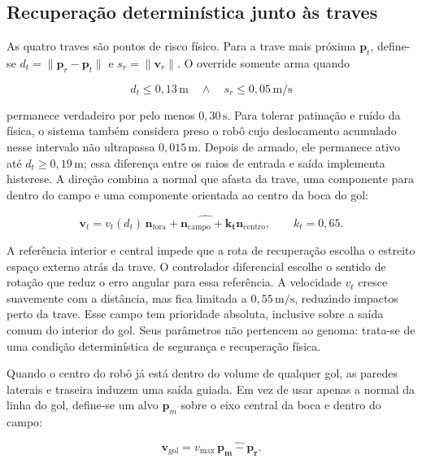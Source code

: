 \documentclass[12pt,a4paper]{article}
\newcommand{\vect}[1]{\boldsymbol{#1}}
\newcommand{\unit}[1]{\widehat{\vect{#1}}}
\begin{document}
\subsection{Recupera\c{c}\~ao determin\'istica junto \`as traves}

As quatro traves s\~ao pontos de risco f\'isico. Para a trave mais pr\'oxima
$\vect{p}_t$, define-se $d_t=\|\vect{p}_r-\vect{p}_t\|$ e
$s_r=\|\vect{v}_r\|$. O override somente arma quando

\begin{equation}
 d_t\leq 0{,}13\,\mathrm{m}\quad\land\quad
 s_r\leq 0{,}05\,\mathrm{m/s}
\end{equation}

permanece verdadeiro por pelo menos $0{,}30\,\mathrm{s}$. Para tolerar
patina\c{c}\~ao e ru\'ido da f\'isica, o sistema tamb\'em considera preso o rob\^o
cujo deslocamento acumulado nesse intervalo n\~ao ultrapassa $0{,}015\,\mathrm{m}$.
Depois de armado,
ele permanece ativo at\'e $d_t\geq0{,}19\,\mathrm{m}$; essa diferen\c{c}a entre
os raios de entrada e sa\'ida implementa histerese. A dire\c{c}\~ao combina a
normal que afasta da trave, uma componente para dentro do campo e uma componente
orientada ao centro da boca do gol:

\begin{equation}
 \vect{v}_{t}=v_t(d_t)\,\unit{\vect{n}_{\mathrm{fora}}+
 \vect{n}_{\mathrm{campo}}+k_t\vect{n}_{\mathrm{centro}}},
 \qquad k_t=0{,}65.
\end{equation}

A refer\^encia interior e central impede que a rota de recupera\c{c}\~ao escolha
o estreito espa\c{c}o externo atr\'as da trave. O controlador diferencial escolhe
o sentido de rota\c{c}\~ao que reduz o erro angular para essa refer\^encia.
A velocidade $v_t$ cresce suavemente com a dist\^ancia,
mas fica limitada a $0{,}55\,\mathrm{m/s}$, reduzindo impactos perto da trave.
Esse campo tem prioridade absoluta, inclusive sobre a sa\'ida comum do interior
do gol. Seus par\^ametros n\~ao pertencem ao genoma: trata-se de uma condi\c{c}\~ao
determin\'istica de seguran\c{c}a e recupera\c{c}\~ao f\'isica.

Quando o centro do rob\^o j\'a est\'a dentro do volume de qualquer gol, as paredes
laterais e traseira induzem uma sa\'ida guiada. Em vez de usar apenas a normal da
linha do gol, define-se um alvo $\vect{p}_m$ sobre o eixo central da boca e dentro
do campo:

\begin{equation}
 \vect{v}_{\mathrm{gol}}=v_{\max}\,
 \unit{\vect{p}_m-\vect{p}_r}.
\end{equation}
\end{document}
